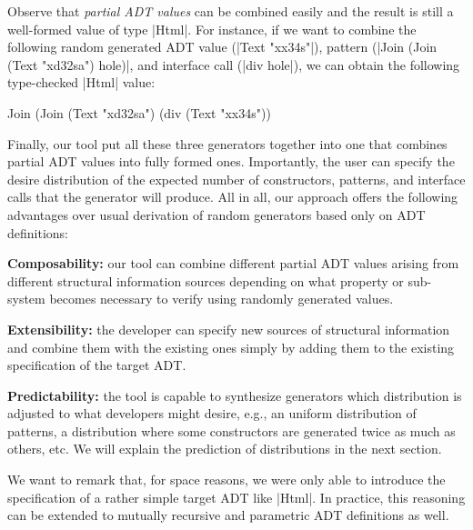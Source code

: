Observe that \emph{partial ADT values} can be combined easily and the result is
still a well-formed value of type |Html|.
%
For instance, if we want to combine the following random generated ADT value
(|Text "xx34s"|), pattern (|Join (Join (Text "xd32sa") hole)|, and interface
call (|div hole|), we can obtain the following type-checked |Html| value:
%
\begin{code}
 Join (Join (Text "xd32sa") (div (Text "xx34s"))
\end{code}


Finally, our tool put all these three generators together into one that combines
partial ADT values into fully formed ones.
%
Importantly, the user can specify the desire distribution of the expected number
of constructors, patterns, and interface calls that the generator will produce.
%
All in all, our approach offers the following advantages over usual derivation
of random generators based only on ADT definitions:
%
\begin{CompactItemize}
\item \textbf{Composability:} our tool can combine different partial ADT values
  arising from different structural information sources depending on what
  property or sub-system becomes necessary to verify using randomly generated
  values.
\item \textbf{Extensibility:} the developer can specify new sources of
  structural information and combine them with the existing ones simply by
  adding them to the existing specification of the target ADT.
\item \textbf{Predictability:} the tool is capable to synthesize generators
  which distribution is adjusted to what developers might desire, e.g., an
  uniform distribution of patterns, a distribution where some constructors are
  generated twice as much as others, etc. We will explain the prediction of
  distributions in the next section.
\end{CompactItemize}
%
We want to remark that, for space reasons, we were only able to introduce the
specification of a rather simple target ADT like |Html|.
%
In practice, this reasoning can be extended to mutually recursive and parametric
ADT definitions as well.

